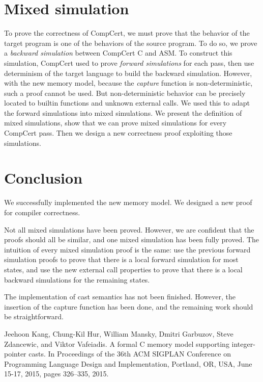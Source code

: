 \documentclass[nocopyrightspace]{sigplanconf}
\begin{document}
\section{Mixed simulation}
To prove the correctness of CompCert, we must prove that the behavior of the target program is one of the behaviors of the source program. To do so, we prove a \textit{backward simulation} between CompCert C and ASM. To construct this simulation, CompCert used to prove \textit{forward simulations} for each pass, then use determinism of the target language to build the backward simulation.
However, with the new memory model, because the \textit{capture} function is non-deterministic, such a proof cannot be used. But non-deterministic behavior can be precisely located to builtin functions and unknown external calls. We used this to adapt the forward simulations into mixed simulations. We present the definition of mixed simulations, show that we can prove mixed simulations for every CompCert pass. Then we design a new correctness proof exploiting those simulations.

\section{Conclusion}
We successfully implemented the new memory model.
We designed a new proof for compiler correctness.

Not all mixed simulations have been proved. However, we are confident that the proofs should all be similar, and one mixed simulation has been fully proved. The intuition of every mixed simulation proof is the same: use the previous forward simulation proofs to prove that there is a local forward simulation for most states, and use the new external call properties to prove that there is a local backward simulations for the remaining states.

The implementation of cast semantics has not been finished. However, the insertion of the capture function has been done, and the remaining work should be straightforward.








\begin{thebibliography}{00}
 Jeehoon Kang, Chung-Kil Hur, William Mansky, Dmitri Garbuzov, Steve Zdancewic, and Viktor Vafeiadis. A formal C memory model supporting integer-pointer casts. In Proceedings of the 36th ACM SIGPLAN Conference on Programming Language Design and Implementation, Portland, OR, USA, June 15-17, 2015, pages 326–335, 2015.
\end{thebibliography}
\end{document}
